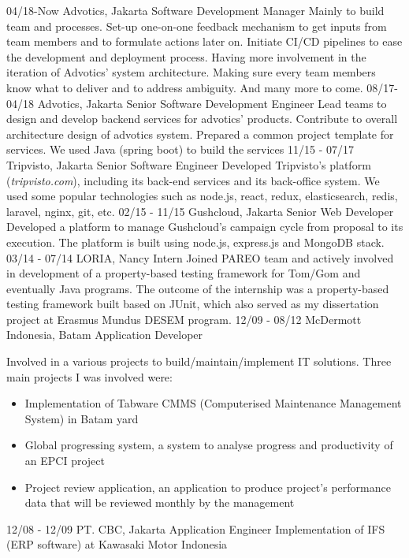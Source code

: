 \documentclass[]{friggeri-cv}
\begin{document}
\begin{entrylist}
  \entry
    {04/18-Now}
    {Advotics, Jakarta}
    {Software Development Manager}
    {Mainly to build team and processes. Set-up one-on-one feedback mechanism to get inputs from team members and to
    formulate actions later on. Initiate CI/CD pipelines to ease the development and deployment process. Having more involvement in the iteration of Advotics' system architecture. Making sure every team members know what to deliver and
    to address ambiguity. And many more to come.}
  \entry
    {08/17-04/18}
    {Advotics, Jakarta}
    {Senior Software Development Engineer}
    {Lead teams to design and develop backend services for advotics' products. Contribute to overall architecture design of 
    advotics system. Prepared a common project template for services. We used Java (spring boot) to build the services}
  \entry
    {11/15 - 07/17}
    {Tripvisto, Jakarta}
    {Senior Software Engineer}
	{Developed Tripvisto's platform (\emph{tripvisto.com}), including its back-end services and its back-office system.
	We used some popular technologies such as node.js, react, redux, elasticsearch, redis, laravel, nginx, git, etc.}
  \entry
	{02/15 - 11/15}
	{Gushcloud, Jakarta}
	{Senior Web Developer}
	{Developed a platform to manage Gushcloud's campaign cycle from proposal to its execution. The platform
	is built using node.js, express.js and MongoDB stack.}
  \entry
	{03/14 - 07/14}
	{LORIA, Nancy}
	{Intern}
	{Joined PAREO team and actively involved in development of a property-based testing framework for Tom/Gom
	and eventually Java programs. The outcome of the internship was a property-based testing framework built based
	on JUnit, which also served as my dissertation project at Erasmus Mundus DESEM program.}
  \entry
	{12/09 - 08/12}
	{McDermott Indonesia, Batam}
	{Application Developer}
	{Involved in a various projects to build/maintain/implement IT solutions. Three main projects I was involved
	were:
	\begin{itemize}
	  \item Implementation of Tabware CMMS (Computerised Maintenance Management System) in Batam yard
	  \item Global progressing system, a system to analyse progress and productivity of an EPCI project
	  \item Project review application, an application to produce project's performance data that will be reviewed monthly by the management
	\end{itemize}}
  \entry
	{12/08 - 12/09}
	{PT. CBC, Jakarta}
	{Application Engineer}
	{Implementation of IFS (ERP software) at Kawasaki Motor Indonesia}
\end{entrylist}
\end{document}
